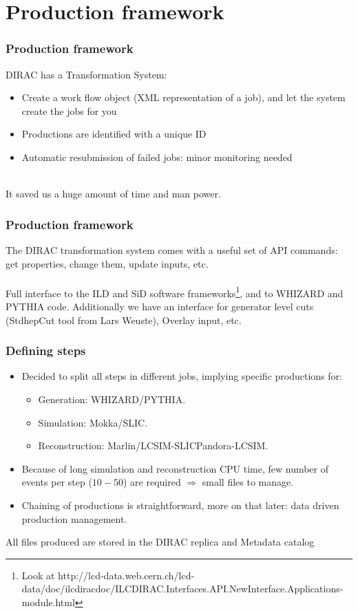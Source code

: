 \documentclass{beamer}
\begin{document}
\section{Production framework}
\begin{frame}
	\frametitle{Production framework}
DIRAC has a Transformation System:
\begin{itemize}
\item  Create a work flow object (XML representation of a job), and let the system create the jobs for you
\item Productions are identified with a unique ID
\item Automatic resubmission of failed jobs: minor monitoring needed
\end{itemize}
~\\
It \alert{saved us a huge amount of time and man power}.
\end{frame}

\begin{frame}
\frametitle{Production framework}
The DIRAC transformation system comes with a useful set of API commands: get properties, change them, update inputs, etc.\\
~\\
\alert{Full interface to the ILD and SiD software frameworks}\footnote{Look at http://lcd-data.web.cern.ch/lcd-data/doc/ilcdiracdoc/ILCDIRAC.Interfaces.API.NewInterface.Applications-module.html}, and to WHIZARD and PYTHIA code. Additionally we have an interface for generator level cuts (StdhepCut tool from Lars Weuste), Overlay input, etc.~\\

\end{frame}

\begin{frame}
\frametitle{Defining steps}
\begin{itemize}
\item Decided to split all steps in different jobs, implying specific productions for:
\begin{itemize}
\item Generation: WHIZARD/PYTHIA.
\item Simulation: Mokka/SLIC.
\item Reconstruction: Marlin/LCSIM-SLICPandora-LCSIM.
\end{itemize}
\item Because of long simulation and reconstruction CPU time, few number of events per step ($10-50$) are required $\Rightarrow$ small files to manage.
\item Chaining of productions is straightforward, more on that later: \alert{data driven production management}.
\end{itemize}
All files produced are stored in the DIRAC replica and Metadata catalog
\end{frame}
\end{document}
